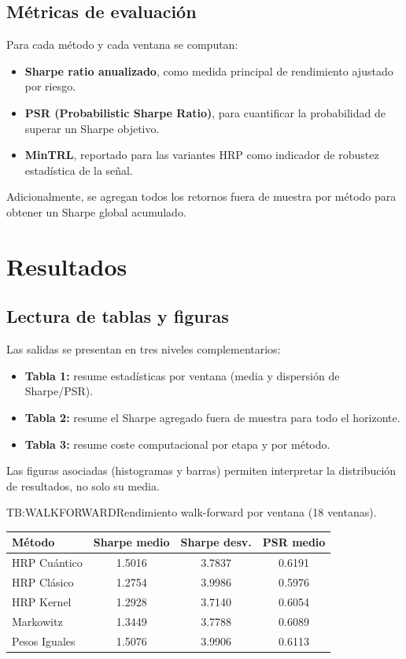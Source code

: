 \subsection{Métricas de evaluación}
Para cada método y cada ventana se computan:

\begin{itemize}
	\item \textbf{Sharpe ratio anualizado}, como medida principal de rendimiento ajustado por riesgo.
	\item \textbf{PSR (Probabilistic Sharpe Ratio)}, para cuantificar la probabilidad de superar un Sharpe objetivo.
	\item \textbf{MinTRL}, reportado para las variantes HRP como indicador de robustez estadística de la señal.
\end{itemize}

Adicionalmente, se agregan todos los retornos fuera de muestra por método para obtener un Sharpe global acumulado.


\section{Resultados}
\label{sec:resultados}

\subsection{Lectura de tablas y figuras}
Las salidas se presentan en tres niveles complementarios:

\begin{itemize}
	\item \textbf{Tabla 1:} resume estadísticas por ventana (media y dispersión de Sharpe/PSR).
	\item \textbf{Tabla 2:} resume el Sharpe agregado fuera de muestra para todo el horizonte.
	\item \textbf{Tabla 3:} resume coste computacional por etapa y por método.
\end{itemize}

Las figuras asociadas (histogramas y barras) permiten interpretar la distribución de resultados, no solo su media.

\begin{table}[Rendimiento walk-forward]{TB:WALKFORWARD}{Rendimiento walk-forward por ventana (18 ventanas).}
\begin{tabular}{lccc}
\hline
\textbf{Método} & \textbf{Sharpe medio} & \textbf{Sharpe desv.} & \textbf{PSR medio} \\
\hline
HRP Cuántico & 1.5016 & 3.7837 & 0.6191 \\
HRP Clásico & 1.2754 & 3.9986 & 0.5976 \\
HRP Kernel & 1.2928 & 3.7140 & 0.6054 \\
Markowitz & 1.3449 & 3.7788 & 0.6089 \\
Pesos Iguales & 1.5076 & 3.9906 & 0.6113 \\
\hline
\end{tabular}
\end{table}

